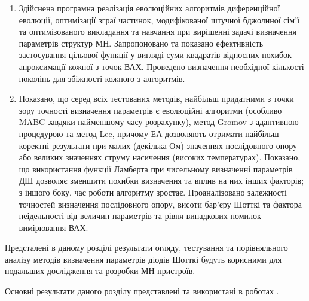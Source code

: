 \begin{enumerate}[leftmargin=0cm,itemindent=3em]
    \item Здійснена програмна реалізація еволюційних алгоритмів  диференційної еволюції, оптимізації зграї частинок,
модифікованої штучної бджолиної сім'ї та оптимізованого викладання та навчання при вирішенні задачі визначення параметрів структур МН.
Запропоновано та показано ефективність застосування цільової функції у вигляді суми квадратів відносних похибок апроксимації кожної з точок ВАХ.
Проведено визначення необхідної кількості поколінь для збіжності кожного з алгоритмів.

   \item Показано, що серед всіх тестованих методів, найбільш придатними з точки зору точності визначення параметрів є еволюційні алгоритми (особливо MABC завдяки найменшому часу розрахунку), метод Gromov з адаптивною процедурою та метод Lee, причому ЕА дозволяють отримати найбільш коректні результати при малих (декілька Ом) значеннях послідовного опору або великих значеннях струму насичення (високих температурах).
    Показано, що використання функції Ламберта при чисельному визначенні параметрів ДШ дозволяє зменшити похибки визначення та вплив на них інших факторів; з іншого боку, час роботи алгоритму зростає.
    Проаналізовано залежності точностей визначення послідовного опору, висоти бар'єру Шотткі та фактора неідельності від величин параметрів та рівня випадкових помилок вимірювання ВАХ.

  \end{enumerate}

Предсталені в даному розділі результати огляду, тестування та порівняльного аналізу методів визначення параметрів діодів Шотткі будуть корисними для подальших дослідження та розробки
МН пристроїв.

Основні результати даного розділу представлені та використані в роботах \cite{Olikh:Rev,6CPFCS,OlikhJAP,Olikh:Ultras2016,Olikh2016JSem}.
